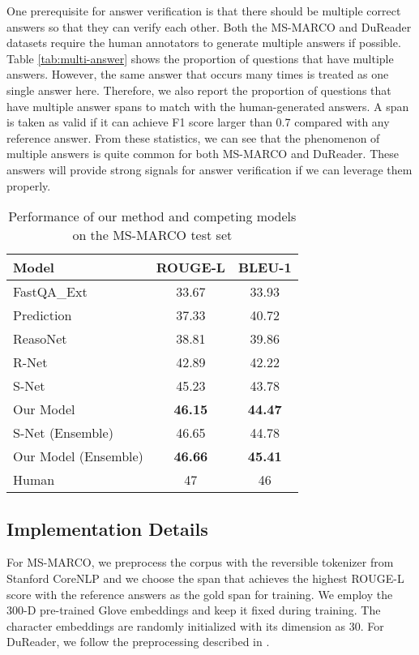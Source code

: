 \documentclass[11pt,a4paper]{article}
\newcommand{\tabref}[1]{Table \ref{#1}}
\begin{document}
One prerequisite for answer verification is that there should be multiple correct answers so that they can verify each other. Both the MS-MARCO and DuReader datasets require the human annotators to generate multiple answers if possible. \tabref{tab:multi-answer} shows the proportion of questions that have multiple answers. However, the same answer that occurs many times is treated as one single answer here. 
Therefore, we also report the proportion of questions that have multiple answer spans to match with the human-generated answers. A span is taken as valid if it can achieve F1 score larger than 0.7 compared with any reference answer. From these statistics, we can see that the phenomenon of multiple answers is quite common for both MS-MARCO and DuReader. These answers will provide strong signals for answer verification if we can leverage them properly.



\begin{table*}[t!]
\centering
\begin{tabular}{lcc}
\hline
Model           & ROUGE-L & BLEU-1 \\ \hline
FastQA\_Ext \cite{fastqa}      & 33.67   & 33.93  \\
Prediction \cite{match-lstm}  & 37.33   & 40.72  \\
ReasoNet   \cite{reasonet}     & 38.81   & 39.86  \\
R-Net      \cite{rnet}     & 42.89   & 42.22  \\
S-Net      \cite{snet}     & 45.23   & 43.78  \\ 
Our Model          & \textbf{46.15}        &  \textbf{44.47}      \\ \hline
S-Net      (Ensemble)     & 46.65   & 44.78  \\
Our Model (Ensemble) & \textbf{46.66}        &  \textbf{45.41}      \\ \hline
Human           & 47      & 46   \\ \hline
\end{tabular}
\caption{Performance of our method and competing models on the MS-MARCO test set}
\label{tab:marco-results}
\end{table*}



\subsection{Implementation Details}
\label{sec:implementation}

For MS-MARCO, we preprocess the corpus with the reversible tokenizer from Stanford CoreNLP \cite{stanford-corenlp} and we choose the span that achieves the highest ROUGE-L score with the reference answers as the gold span for training. We employ the 300-D pre-trained Glove embeddings \cite{glove} and keep it fixed during training. The character embeddings are randomly initialized with its dimension as 30. For DuReader, we follow the preprocessing described in . 
\end{document}
